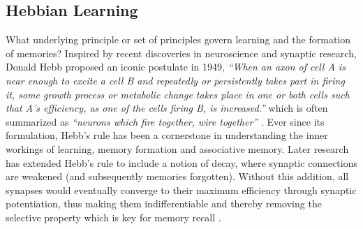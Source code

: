 \subsection{Hebbian Learning}

What underlying principle or set of principles govern learning and the formation of memories? Inspired by recent discoveries in neuroscience and synaptic research, Donald Hebb proposed an iconic postulate in 1949, \textit{``When an axon of cell A is near enough to excite a cell B and repeatedly or persistently takes part in firing it, some growth process or metabolic change takes place in one or both cells such that A's efficiency, as one of the cells firing B, is increased.''} which is often summarized as \textit{``neurons which fire together, wire together''} \cite{hebbs_rule}. Ever since its formulation, Hebb's rule has been a cornerstone in understanding the inner workings of learning, memory formation and associative memory. Later research has extended Hebb's rule to include a notion of decay, where synaptic connections are weakened (and subsequently memories forgotten). Without this addition, all synapses would eventually converge to their maximum efficiency through synaptic potentiation, thus making them indifferentiable and thereby removing the selective property which is key for memory recall \cite{anti_hebbian}.
